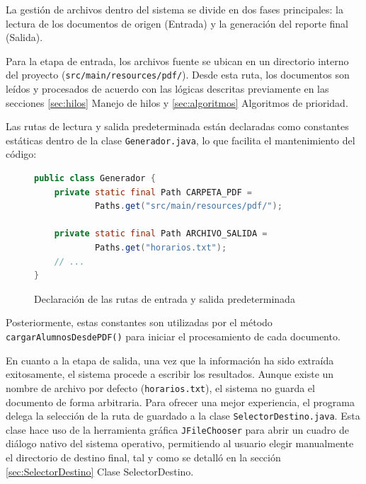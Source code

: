 La gestión de archivos dentro del sistema se divide en dos
fases principales: la lectura de los documentos de origen
(Entrada) y la generación del reporte final (Salida).

Para la etapa de entrada, los archivos fuente se ubican
en un directorio interno del proyecto \newline
(\texttt{src/main/resources/pdf/}).
Desde esta ruta, los documentos son leídos y procesados
de acuerdo con las lógicas descritas previamente en las
secciones \ref{sec:hilos} Manejo de hilos y 
\ref{sec:algoritmos} Algoritmos de prioridad. 

Las rutas de lectura y salida predeterminada están
declaradas como constantes estáticas dentro de la clase
\texttt{Generador.java}, lo que facilita el mantenimiento
del código:

\vspace{-0.2cm}
\begin{figure}[H]
    \centering
    \caption{Declaración de las rutas de entrada y salida predeterminada}
    \label{code:path_entrada_archivos}
    \vspace{-0.2cm}
    \begin{lstlisting}[language=Java]
public class Generador {
    private static final Path CARPETA_PDF =
            Paths.get("src/main/resources/pdf/");
            
    private static final Path ARCHIVO_SALIDA =
            Paths.get("horarios.txt");
    // ...
}
    \end{lstlisting}
\end{figure}

Posteriormente, estas constantes son utilizadas por el método
\texttt{cargarAlumnosDesdePDF()} para iniciar el
procesamiento de cada documento.

En cuanto a la etapa de salida, una vez que la información
ha sido extraída exitosamente, el sistema procede a escribir
los resultados. Aunque existe un nombre de archivo por defecto
(\texttt{horarios.txt}), el sistema no guarda el documento
de forma arbitraria. Para ofrecer una mejor experiencia,
el programa delega la selección de la ruta de guardado
a la clase \texttt{SelectorDestino.java}. Esta clase hace
uso de la herramienta gráfica \texttt{JFileChooser} para
abrir un cuadro de diálogo nativo del sistema operativo,
permitiendo al usuario elegir manualmente el directorio
de destino final, tal y como se detalló en la sección
\ref{sec:SelectorDestino} Clase SelectorDestino.